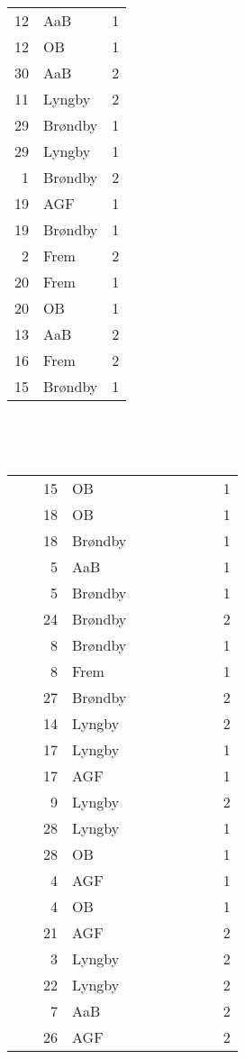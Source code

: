 {\begin{center}
\begin{small}
{\begin{tabular}{|r|l|r|}
12 & AaB      &      1 \\ 
12 & OB       &      1 \\ 
30 & AaB      &      2 \\ 
11 & Lyngby   &      2 \\ 
29 & Br\o{}ndby &      1 \\ 
29 & Lyngby   &      1 \\ 
 1 & Br\o{}ndby &      2 \\ 
19 & AGF      &      1 \\ 
19 & Br\o{}ndby &      1 \\ 
 2 & Frem     &      2 \\ 
20 & Frem     &      1 \\ 
20 & OB       &      1 \\ 
13 & AaB      &      2 \\ 
16 & Frem     &      2 \\ 
15 & Br\o{}ndby &      1
\end{tabular}
}
~~~~~~~
{\tt
\begin{tabular}{|r|l|r|}
~~~~15 & OB~~~~~~~       &      ~~~~~~~~~1 \\ 
18 & OB       &      1 \\ 
18 & Br\o{}ndby &      1 \\ 
 5 & AaB      &      1 \\ 
 5 & Br\o{}ndby &      1 \\ 
24 & Br\o{}ndby &      2 \\ 
 8 & Br\o{}ndby &      1 \\ 
 8 & Frem     &      1 \\ 
27 & Br\o{}ndby &      2 \\ 
14 & Lyngby   &      2 \\ 
17 & Lyngby   &      1 \\ 
17 & AGF      &      1 \\ 
 9 & Lyngby   &      2 \\ 
28 & Lyngby   &      1 \\ 
28 & OB       &      1 \\ 
 4 & AGF      &      1 \\ 
 4 & OB       &      1 \\ 
21 & AGF      &      2 \\ 
 3 & Lyngby   &      2 \\ 
22 & Lyngby   &      2 \\ 
 7 & AaB      &      2 \\ 
26 & AGF      &      2 \\\hline
\end{tabular}
}
\end{small}
\end{center}
}

